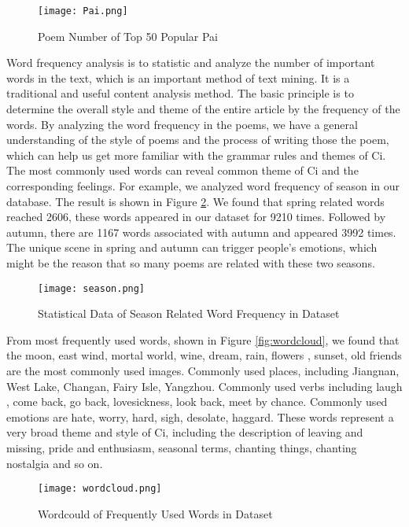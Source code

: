 \begin{figure}[htbp]
	\centering
	\texttt{[image: Pai.png]}
	\caption{Poem Number of Top 50 Popular Pai}
	\label{fig:pai}
\end{figure}
%

Word frequency analysis is to statistic and analyze the number of important words in the text, which is an important method of text mining. It is a traditional and useful content analysis method. The basic principle is to determine the overall style and theme of the entire article by the frequency of the words. By analyzing the word frequency in the poems, we have a general understanding of the style of poems and the process of writing those the poem, which can help us get more familiar with the grammar rules and themes of Ci. The most commonly used words can reveal common theme of Ci and the corresponding feelings. For example, we analyzed word frequency of season in our database. The result is shown in Figure \ref{fig:season}. We found that spring related words reached 2606, these words appeared in our dataset for 9210 times. Followed by autumn, there are 1167 words associated with autumn and appeared 3992 times. The unique scene in spring and autumn can trigger people's emotions, which might be the reason that so many poems are related with these two seasons.
\begin{figure}[htbp]
	\centering
	\texttt{[image: season.png]}
	\caption{Statistical Data of Season Related Word Frequency in Dataset}
	\label{fig:season}
\end{figure}
%
From most frequently used words, shown in Figure \ref{fig:wordcloud}, we found that the moon, east wind, mortal world, wine, dream, rain, flowers , sunset, old friends are the most commonly used images. Commonly used places, including Jiangnan, West Lake, Changan, Fairy Isle, Yangzhou. Commonly used verbs including laugh , come back, go back, lovesickness, look back, meet by chance. Commonly used emotions are hate, worry, hard, sigh, desolate, haggard. These words represent a very broad theme and style of Ci, including the description of leaving and missing, pride and enthusiasm, seasonal terms, chanting things, chanting nostalgia and so on.
\begin{figure}[htbp]
	\centering
	\texttt{[image: wordcloud.png]}
	\caption{Wordcould of Frequently Used Words in Dataset}
	\label{fig:wordcould}
\end{figure}
%
